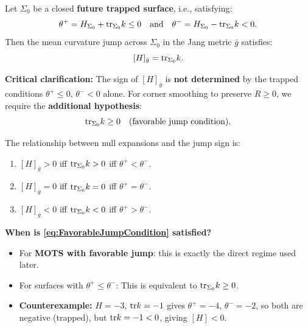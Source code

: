 \begin{lemma}\label{lem:TrappedMeanCurvatureJump}
Let $\Sigma_0$ be a closed \textbf{future trapped surface}, i.e., satisfying:
\[
    \theta^+ = H_{\Sigma_0} + \mathrm{tr}_{\Sigma_0} k \le 0 \quad \text{and} \quad \theta^- = H_{\Sigma_0} - \mathrm{tr}_{\Sigma_0} k < 0.
\]
Then the mean curvature jump across $\Sigma_0$ in the Jang metric $\bar{g}$ satisfies:
\begin{equation}\label{eq:JumpFormulaLemma}
    [H]_{\bar{g}} = \mathrm{tr}_{\Sigma_0} k.
\end{equation}

\textbf{Critical clarification:} The sign of $[H]_{\bar{g}}$ is \textbf{not determined} by the trapped conditions $\theta^+ \le 0$, $\theta^- < 0$ alone. For corner smoothing to preserve $R \ge 0$, we require the \textbf{additional hypothesis}:
\begin{equation}\label{eq:FavorableJumpCondition}
    \mathrm{tr}_{\Sigma_0} k \ge 0 \quad \text{(favorable jump condition)}.
\end{equation}

The relationship between null expansions and the jump sign is:
\begin{enumerate}
    \item $[H]_{\bar{g}} > 0$ iff $\mathrm{tr}_{\Sigma_0} k > 0$ iff $\theta^+ < \theta^-$.
    \item $[H]_{\bar{g}} = 0$ iff $\mathrm{tr}_{\Sigma_0} k = 0$ iff $\theta^+ = \theta^-$.
    \item $[H]_{\bar{g}} < 0$ iff $\mathrm{tr}_{\Sigma_0} k < 0$ iff $\theta^+ > \theta^-$.
\end{enumerate}

\textbf{When is \eqref{eq:FavorableJumpCondition} satisfied?}
\begin{itemize}
    \item For \textbf{MOTS with favorable jump}: this is exactly the direct regime used later.
    \item For surfaces with $\theta^+ \le \theta^-$: This is equivalent to $\mathrm{tr}_{\Sigma_0} k \ge 0$.
    \item \textbf{Counterexample:} $H = -3$, $\mathrm{tr} k = -1$ gives $\theta^+ = -4$, $\theta^- = -2$, so both are negative (trapped), but $\mathrm{tr} k = -1 < 0$, giving $[H] < 0$.
\end{itemize}
\end{lemma}

